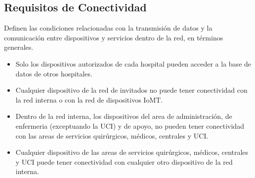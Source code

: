 \subsection{Requisitos de Conectividad}
Definen las condiciones relacionadas con la transmisión de datos y la comunicación entre dispositivos y servicios dentro de la red, en términos generales.
\begin{itemize}
    \item Solo los dispositivos autorizados de cada hospital pueden acceder a la base de datos de otros hospitales.
    \item Cualquier dispositivo de la red de invitados no puede tener conectividad con la red interna o con la red de dispositivos IoMT.
    \item Dentro de la red interna, los dispositivos del area de administración, de enfermeria (exceptuando la UCI) y de apoyo, no pueden tener conectividad 
    con las areas de servicios quirúrgicos, médicos, centrales y UCI.
    \item Cualquier dispositivo de las areas de servicios quirúrgicos, médicos, centrales y UCI puede tener conectividad con cualquier otro dispositivo de la red interna.
\end{itemize}

